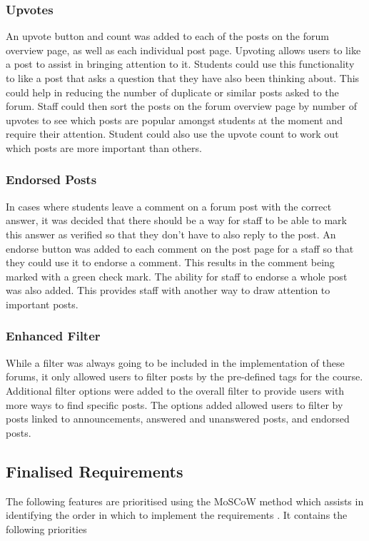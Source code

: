 \subsubsection{Upvotes}
An upvote button and count was added to each of the posts on the forum overview page, as well as each individual post page.
Upvoting allows users to like a post to assist in bringing attention to it.
Students could use this functionality to like a post that asks a question that they have also been thinking about.
This could help in reducing the number of duplicate or similar posts asked to the forum.
Staff could then sort the posts on the forum overview page by number of upvotes to see which posts are popular amongst students at the moment and require their attention.
Student could also use the upvote count to work out which posts are more important than others.

\subsubsection{Endorsed Posts}
In cases where students leave a comment on a forum post with the correct answer, it was decided that there should be a way for staff to be able to mark this answer as verified so that they don't have to also reply to the post.
An endorse button was added to each comment on the post page for a staff so that they could use it to endorse a comment.
This results in the comment being marked with a green check mark.
The ability for staff to endorse a whole post was also added.
This provides staff with another way to draw attention to important posts.

\subsubsection{Enhanced Filter}
While a filter was always going to be included in the implementation of these forums, it only allowed users to filter posts by the pre-defined tags for the course.
Additional filter options were added to the overall filter to provide users with more ways to find specific posts.
The options added allowed users to filter by posts linked to announcements, answered and unanswered posts, and endorsed posts.

\subsection{Finalised Requirements}
The following features are prioritised using the MoSCoW method which assists in identifying the order in which to implement the requirements \cite{moscow}.
It contains the following priorities

